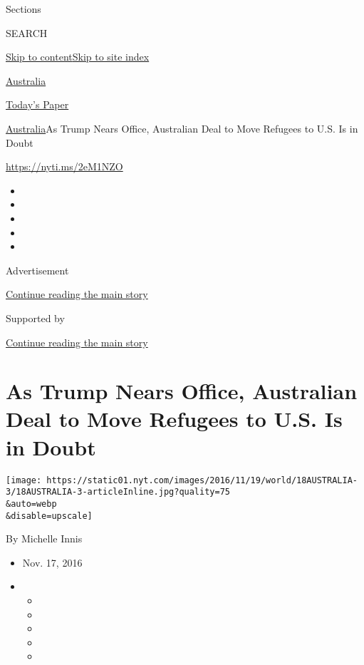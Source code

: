 Sections

SEARCH

\protect\hyperlink{site-content}{Skip to
content}\protect\hyperlink{site-index}{Skip to site index}

\href{https://www.nytimes.com/section/world/australia}{Australia}

\href{https://myaccount.nytimes.com/auth/login?response_type=cookie\&client_id=vi}{}

\href{https://www.nytimes.com/section/todayspaper}{Today's Paper}

\href{/section/world/australia}{Australia}\textbar{}As Trump Nears
Office, Australian Deal to Move Refugees to U.S. Is in Doubt

\url{https://nyti.ms/2eM1NZO}

\begin{itemize}
\item
\item
\item
\item
\item
\end{itemize}

Advertisement

\protect\hyperlink{after-top}{Continue reading the main story}

Supported by

\protect\hyperlink{after-sponsor}{Continue reading the main story}

\hypertarget{as-trump-nears-office-australian-deal-to-move-refugees-to-us-is-in-doubt}{%
\section{As Trump Nears Office, Australian Deal to Move Refugees to U.S.
Is in
Doubt}\label{as-trump-nears-office-australian-deal-to-move-refugees-to-us-is-in-doubt}}

\texttt{[image: https://static01.nyt.com/images/2016/11/19/world/18AUSTRALIA-3/18AUSTRALIA-3-articleInline.jpg?quality=75\\\&auto=webp\\\&disable=upscale]}

By Michelle Innis

\begin{itemize}
\item
  Nov. 17, 2016
\item
  \begin{itemize}
  \item
  \item
  \item
  \item
  \item
  \end{itemize}
\end{itemize}

